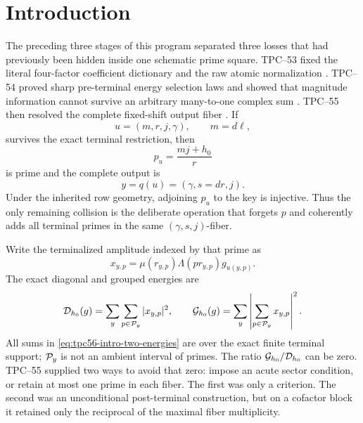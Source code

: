 \section{Introduction}
\label{sec:introduction}

The preceding three stages of this program separated three losses that
had previously been hidden inside one schematic prime square.  TPC--53
fixed the literal four-factor coefficient dictionary and the raw atomic
normalization \citep{WangTPC53}.  TPC--54 proved sharp pre-terminal energy
selection laws and showed that magnitude information cannot survive an
arbitrary many-to-one complex sum \citep{WangTPC54}.  TPC--55 then resolved
the complete fixed-shift output fiber \citep{WangTPC55}.  If
\[
 u=(m,r,j,\gamma),\qquad m=d\ell,
\]
survives the exact terminal restriction, then
\begin{equation}
 p_u=\frac{mj+h_0}{r}
 \label{eq:tpc56-intro-terminal-prime}
\end{equation}
is prime and the complete output is
\begin{equation}
 y=q(u)=(\gamma,s=d r,j).
 \label{eq:tpc56-intro-output-key}
\end{equation}
Under the inherited row geometry, adjoining \(p_u\) to the key is
injective.  Thus the only remaining collision is the deliberate operation
that forgets \(p\) and coherently adds all terminal primes in the same
\((\gamma,s,j)\)-fiber.

Write the terminalized amplitude indexed by that prime as
\begin{equation}
 x_{y,p}
 =\mu(r_{y,p})\Lambda(p r_{y,p})g_{u(y,p)}.
 \label{eq:tpc56-intro-literal-amplitude}
\end{equation}
The exact diagonal and grouped energies are
\begin{equation}
 \mathcal D_{h_0}(g)=\sum_y\sum_{p\in\mathcal P_y}|x_{y,p}|^2,
 \qquad
 \mathcal G_{h_0}(g)=\sum_y\left|\sum_{p\in\mathcal P_y}x_{y,p}\right|^2.
 \label{eq:tpc56-intro-two-energies}
\end{equation}
All sums in \eqref{eq:tpc56-intro-two-energies} are over the exact finite
terminal support; \(\mathcal P_y\) is not an ambient interval of primes.  The
ratio \(\mathcal G_{h_0}/\mathcal D_{h_0}\) can be zero.  TPC--55 supplied two ways to
avoid that zero: impose an acute sector condition, or retain at most one
prime in each fiber.  The first was only a criterion.  The second was an
unconditional post-terminal construction, but on a cofactor block it
retained only the reciprocal of the maximal fiber multiplicity.

